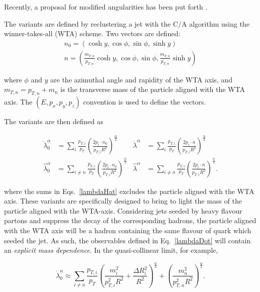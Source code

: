 \documentclass[10pt,a4paper]{book}
\begin{document}
Recently, a proposal for modified angularities has been put forth \cite{Dhani:2024gtx}. 

The variants are defined by reclustering a jet with the C/A algorithm using the winner-takes-all (WTA) scheme. Two vectors are defined:
\begin{gather}
n_0 = \left(\cosh y, \cos \phi, \sin \phi, \sinh y \right) \\
n = \left(\frac{m_{T, n}}{p_{T, n}} \cosh y, \cos \phi, \sin \phi, \frac{m_{T, n}}{p_{T, n}}\sinh y \right)
\end{gather}

where $\phi$ and $y$ are the azimuthal angle and rapidity of the WTA axis, and $m_{T, n} = p_{T, n} + m_{n}$ is the transverse mass of the particle aligned with the WTA axis. The $(E, p_x, p_y, p_z)$ convention is used to define the vectors.

The variants are then defined as

\begin{align}
\label{lambdaDot}
\dot{\lambda}_0^\alpha &= \sum_i \frac{p_{T,i}}{p_T}\left(\frac{2p_i\cdot n_0}{p_{T,i}R^2} \right)^{\frac{\alpha}{2}}  & 
\dot{\lambda}^\alpha &= \sum_i \frac{p_{T,i}}{p_T}\left(\frac{2p_i\cdot n}{p_{T,i}R^2} \right)^{\frac{\alpha}{2}} \\
\label{lambdaHat}
\hat{\lambda}_0^\alpha &= \sum_{i\neq n} \frac{p_{T,i}}{p_T}\left(\frac{2p_i\cdot n_0}{p_{T,i}R^2} \right)^{\frac{\alpha}{2}}  &
\hat{\lambda}^\alpha &= \sum_{i\neq n} \frac{p_{T,i}}{p_T}\left(\frac{2p_i\cdot n}{p_{T,i}R^2} \right)^{\frac{\alpha}{2}}.
\end{align}

where the sums in Eqs.~\ref{lambdaHat} excludes the particle aligned with the WTA axis. 
These variants are specifically designed to bring to light the mass of the particle aligned with the WTA-axis. Considering jets seeded by heavy flavour partons and suppress the decay of the corresponding hadrons, the particle aligned with the WTA axis will be a hadron containing the same flavour of quark which seeded the jet. As such, the observables defined in Eq.~\ref{lambdaDot} will contain an \emph{explicit mass dependence}. In the quasi-collinear limit, for example,

\begin{equation}
\dot{\lambda}^\alpha_0 \approx \sum_{i \neq n}\frac{p_{T,i}}{p_T}\left(\frac{m_i^2}{p_{T,i}^2R^2} + \frac{\Delta R_i^2}{R^2} \right)^{\frac{\alpha}{2}} + \left(\frac{m_n^2}{p_{T,n}^2R^2} \right)^{\frac{\alpha}{2}}.
\end{equation}
\end{document}
